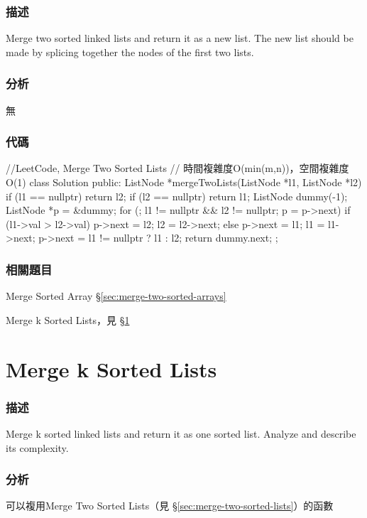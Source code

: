 \subsubsection{描述}
Merge two sorted linked lists and return it as a new list. The new list should be made by splicing together the nodes of the first two lists.


\subsubsection{分析}
無


\subsubsection{代碼}
\begin{Code}
//LeetCode, Merge Two Sorted Lists
// 時間複雜度O(min(m,n))，空間複雜度O(1)
class Solution {
public:
    ListNode *mergeTwoLists(ListNode *l1, ListNode *l2) {
        if (l1 == nullptr) return l2;
        if (l2 == nullptr) return l1;
        ListNode dummy(-1);
        ListNode *p = &dummy;
        for (; l1 != nullptr && l2 != nullptr; p = p->next) {
            if (l1->val > l2->val) { p->next = l2; l2 = l2->next; }
            else { p->next = l1; l1 = l1->next; }
        }
        p->next = l1 != nullptr ? l1 : l2;
        return dummy.next;
    }
};
\end{Code}


\subsubsection{相關題目}
\begindot
\item Merge Sorted Array \S \ref{sec:merge-two-sorted-arrays}
\item Merge k Sorted Lists，見 \S \ref{sec:merge-k-sorted-lists}
\myenddot


\section{Merge k Sorted Lists} %
\label{sec:merge-k-sorted-lists}


\subsubsection{描述}
Merge k sorted linked lists and return it as one sorted list. Analyze and describe its complexity.


\subsubsection{分析}
可以複用Merge Two Sorted Lists（見 \S \ref{sec:merge-two-sorted-lists}）的函數


